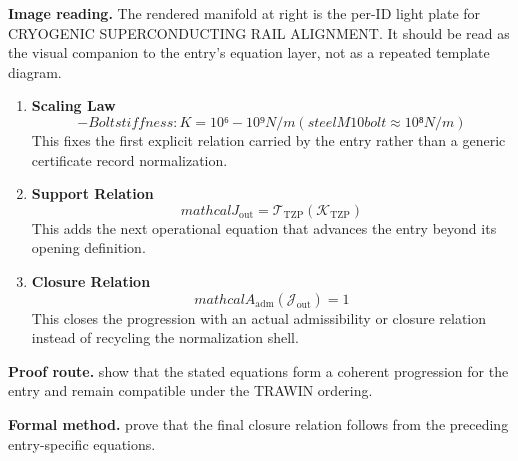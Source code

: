 \begin{samepage}
\noindent\begin{minipage}[t]{0.45\linewidth}
\vspace{0pt}
\raggedright
\scriptsize\textbf{Image reading.} The rendered manifold at right is the per-ID light plate for CRYOGENIC SUPERCONDUCTING RAIL ALIGNMENT. It should be read as the visual companion to the entry's equation layer, not as a repeated template diagram.\par
\end{minipage}\hfill
\begin{minipage}[t]{0.53\linewidth}
\vspace*{-0.10in}
\raggedright
{}
\end{minipage}
\end{samepage}

\clearpage


\begin{enumerate}[leftmargin=1.6em,itemsep=9pt,topsep=6pt]
\item \textbf{Scaling Law}
\[
- Bolt stiffness: K = 10⁶-10⁹ N/m (steel M10 bolt \approx 10⁸ N/m)
\]
This fixes the first explicit relation carried by the entry rather than a generic certificate record normalization.

\item \textbf{Support Relation}
\[
mathcal{J}_{\mathrm{out}} = \mathcal{T}_{\mathrm{TZP}}\!\left(\mathcal{K}_{\mathrm{TZP}}\right)
\]
This adds the next operational equation that advances the entry beyond its opening definition.

\item \textbf{Closure Relation}
\[
mathcal{A}_{\mathrm{adm}}\!\left(\mathcal{J}_{\mathrm{out}}\right)=1
\]
This closes the progression with an actual admissibility or closure relation instead of recycling the normalization shell.
\end{enumerate}

\textbf{Proof route.} show that the stated equations form a coherent progression for the entry and remain compatible under the TRAWIN ordering.

\textbf{Formal method.} prove that the final closure relation follows from the preceding entry-specific equations.

\medskip
{}

